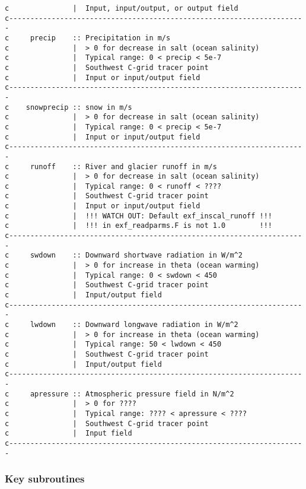 {\begin{verbatim}
c               |  Input, input/output, or output field
c----------------------------------------------------------------------
c     precip    :: Precipitation in m/s
c               |  > 0 for decrease in salt (ocean salinity)
c               |  Typical range: 0 < precip < 5e-7
c               |  Southwest C-grid tracer point
c               |  Input or input/output field
c----------------------------------------------------------------------
c    snowprecip :: snow in m/s
c               |  > 0 for decrease in salt (ocean salinity)
c               |  Typical range: 0 < precip < 5e-7
c               |  Input or input/output field
c----------------------------------------------------------------------
c     runoff    :: River and glacier runoff in m/s
c               |  > 0 for decrease in salt (ocean salinity)
c               |  Typical range: 0 < runoff < ????
c               |  Southwest C-grid tracer point
c               |  Input or input/output field
c               |  !!! WATCH OUT: Default exf_inscal_runoff !!!
c               |  !!! in exf_readparms.F is not 1.0        !!!
c----------------------------------------------------------------------
c     swdown    :: Downward shortwave radiation in W/m^2
c               |  > 0 for increase in theta (ocean warming)
c               |  Typical range: 0 < swdown < 450
c               |  Southwest C-grid tracer point
c               |  Input/output field
c----------------------------------------------------------------------
c     lwdown    :: Downward longwave radiation in W/m^2
c               |  > 0 for increase in theta (ocean warming)
c               |  Typical range: 50 < lwdown < 450
c               |  Southwest C-grid tracer point
c               |  Input/output field
c----------------------------------------------------------------------
c     apressure :: Atmospheric pressure field in N/m^2
c               |  > 0 for ????
c               |  Typical range: ???? < apressure < ????
c               |  Southwest C-grid tracer point
c               |  Input field
c----------------------------------------------------------------------

\end{verbatim}
}


\subsubsection{Key subroutines
\label{sec:pkg:exf:subroutines}}

